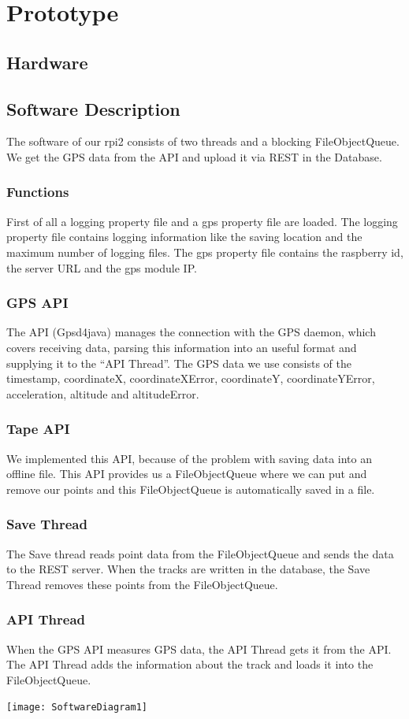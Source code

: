 \setcounter{chapter}{0}
\chapter{Prototype}
\section{Hardware}
\newpage
\section{Software Description}
The software of our \gls{rpi2} consists of two threads and a blocking FileObjectQueue. We get the GPS data from the API and upload it via REST in the Database. 
\subsection{Functions}
First of all a logging property file and a gps property file are loaded. The logging property file contains logging information like the saving location and the maximum number of logging files. The gps property file contains the raspberry id, the server URL and the gps module IP.
\subsection{GPS API}
The API (Gpsd4java) manages the connection with the GPS daemon, which covers receiving data, parsing this information into an useful format and supplying it to the “API Thread”. The GPS data we use consists of the timestamp, coordinateX, coordinateXError, coordinateY, coordinateYError, acceleration, altitude and altitudeError.
\subsection{Tape API}
We implemented this API, because of the problem with saving data into an offline file. This API provides us a FileObjectQueue where we can put and remove our points and this FileObjectQueue is automatically saved in a file. 
\subsection{Save Thread}
The Save thread reads point data from the FileObjectQueue and sends the data to the REST server. When the tracks are written in the database, the Save Thread removes these points from the FileObjectQueue.
\subsection{API Thread}
When the GPS API measures GPS data, the API Thread gets it from the API. The API Thread adds the information about the track and loads it into the FileObjectQueue.
\begin{center}
\texttt{[image: SoftwareDiagram1]}
\end{center} 

